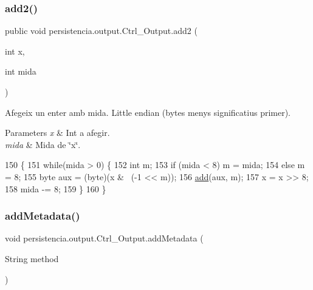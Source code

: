 \subsubsection{\texorpdfstring{add2()}{add2()}}
{\footnotesize\ttfamily public void persistencia.\+output.\+Ctrl\+\_\+\+Output.\+add2 (\begin{DoxyParamCaption}\item[{int}]{x,  }\item[{int}]{mida }\end{DoxyParamCaption})\hspace{0.3cm}{\ttfamily [inline]}}



Afegeix un enter amb mida. Little endian (bytes menys significatius primer). 


\begin{DoxyParams}{Parameters}
{\em x} & Int a afegir. \\
\hline
{\em mida} & Mida de \char`\"{}x\char`\"{}. \\
\hline
\end{DoxyParams}

\begin{DoxyCode}
150     \{
151         \textcolor{keywordflow}{while}(mida > 0) \{
152             \textcolor{keywordtype}{int} m;
153             \textcolor{keywordflow}{if} (mida < 8) m = mida;
154             \textcolor{keywordflow}{else} m = 8;
155             byte aux = (byte)(x & ~(-1 << m));
156             \hyperlink{classpersistencia_1_1output_1_1Ctrl__Output_a8c5aa5a6acb5259faeb1c05c71ddd21c}{add}(aux, m);
157             x = x >> 8;
158             mida -= 8;
159         \}
160     \}
\end{DoxyCode}
\mbox{\label{classpersistencia_1_1output_1_1Ctrl__Output_ae6d6857910a023982900ddc857b891f0}} 
\subsubsection{\texorpdfstring{add\+Metadata()}{addMetadata()}}
{\footnotesize\ttfamily void persistencia.\+output.\+Ctrl\+\_\+\+Output.\+add\+Metadata (\begin{DoxyParamCaption}\item[{String}]{method }\end{DoxyParamCaption})\hspace{0.3cm}{\ttfamily [inline]}}



